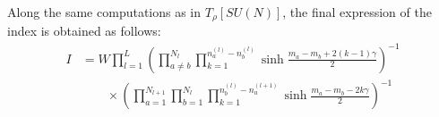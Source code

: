 \documentclass[a4paper,11pt]{article}
\begin{document}
Along the same computations as in $T_\rho [SU(N)]$, the final expression of the index is obtained as follows:
\begin{align}
\label{eq:N=2 result}
%
I &= W \prod_{l = 1}^L \left(\prod_{a \neq b}^{N_l} \prod_{k = 1}^{n^{(l)}_a-n^{(l)}_b} \sinh \frac{m_a-m_b+2 (k-1) \gamma}{2}\right)^{-1} \nonumber \\
%
&\qquad \times \left(\prod_{a = 1}^{N_{l+1}} \prod_{b = 1}^{N_l} \prod_{k = 1}^{n^{(l)}_b-n^{(l+1)}_a} \sinh \frac{m_a-m_b-2 k \gamma}{2}\right)^{-1}
%
\end{align}
\end{document}
